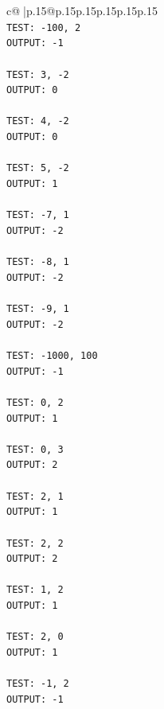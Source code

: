 \documentclass{article}
\begin{document}
{\begin{supertabular}{c@{$\;$}|p{.15\linewidth}@{}p{.15\linewidth}p{.15\linewidth}p{.15\linewidth}p{.15\linewidth}p{.15\linewidth}}
{{{\\ 
\texttt{TEST: {-}100, 2} \\
\texttt{OUTPUT: {-}1} \\
\\ 
\texttt{TEST: 3, {-}2} \\
\texttt{OUTPUT: 0} \\
\\ 
\texttt{TEST: 4, {-}2} \\
\texttt{OUTPUT: 0} \\
\\ 
\texttt{TEST: 5, {-}2} \\
\texttt{OUTPUT: 1} \\
\\ 
\texttt{TEST: {-}7, 1} \\
\texttt{OUTPUT: {-}2} \\
\\ 
\texttt{TEST: {-}8, 1} \\
\texttt{OUTPUT: {-}2} \\
\\ 
\texttt{TEST: {-}9, 1} \\
\texttt{OUTPUT: {-}2} \\
\\ 
\texttt{TEST: {-}1000, 100} \\
\texttt{OUTPUT: {-}1} \\
\\ 
\texttt{TEST: 0, 2} \\
\texttt{OUTPUT: 1} \\
\\ 
\texttt{TEST: 0, 3} \\
\texttt{OUTPUT: 2} \\
\\ 
\texttt{TEST: 2, 1} \\
\texttt{OUTPUT: 1} \\
\\ 
\texttt{TEST: 2, 2} \\
\texttt{OUTPUT: 2} \\
\\ 
\texttt{TEST: 1, 2} \\
\texttt{OUTPUT: 1} \\
\\ 
\texttt{TEST: 2, 0} \\
\texttt{OUTPUT: 1} \\
\\ 
\texttt{TEST: {-}1, 2} \\
\texttt{OUTPUT: {-}1} \\
\\ 
}}}
\end{supertabular}}
\end{document}
